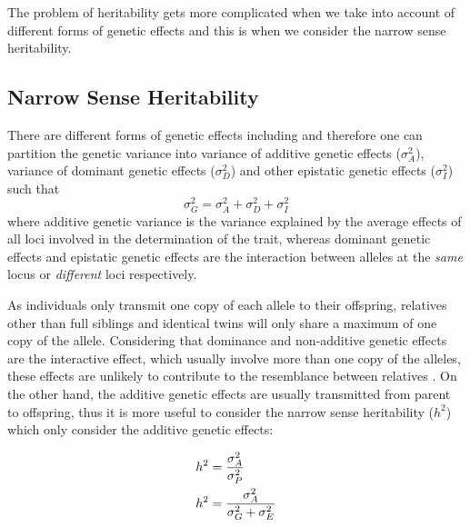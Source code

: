 \documentclass[12pt]{scrbook}
\begin{document}
	The problem of heritability gets more complicated when we take into account of different forms of genetic effects and this is when we consider the narrow sense heritability.
	
	\subsection{Narrow Sense Heritability}
	There are different forms of genetic effects including and therefore one can partition the genetic variance into variance of additive genetic effects ($\sigma_A^2$), variance of dominant genetic effects ($\sigma_D^2$) and other epistatic genetic effects ($\sigma_I^2$) such that
	$$
	\sigma_G^2=\sigma_A^2+\sigma_D^2+\sigma_I^2
	$$
	where additive genetic variance is the variance explained by the average effects of all loci involved in the determination of the trait, whereas dominant genetic effects and epistatic genetic effects are the interaction between alleles at the \emph{same} locus or \emph{different} loci respectively.
	
	As individuals only transmit one copy of each allele to their offspring, relatives other than full siblings and identical twins will only share a maximum of one copy of the allele.
	Considering that dominance and non-additive genetic effects are the interactive effect, which usually involve more than one copy of the alleles, these effects are unlikely to contribute to the resemblance between relatives \citep{Visscher2008}.
	On the other hand, the additive genetic effects are usually transmitted from parent to offspring, thus it is more useful to consider the narrow sense heritability ($h^2$) which only consider the additive genetic effects:
	
	\begin{align}
	h^2&=\frac{\sigma_A^2}{\sigma_P^2} \notag\\
	h^2&=\frac{\sigma_A^2}{\sigma_G^2+\sigma_E^2}
	\label{eq:narrowHeritability}
	\end{align}
	
\end{document}
